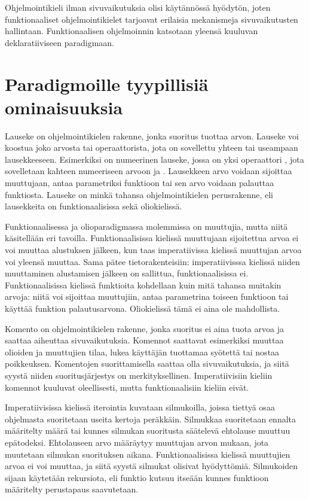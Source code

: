 Ohjelmointikieli ilman sivuvaikutuksia olisi käytännössä hyödytön, joten funktionaaliset ohjelmointikielet tarjoavat erilaisia mekanismeja sivuvaikutusten hallintaan.  Funktionaalisen ohjelmoinnin katsotaan yleensä kuuluvan deklaratiiviseen paradigmaan. \cite[Luku 11]{principlesAndParadigms}


\section{Paradigmoille tyypillisiä ominaisuuksia}
Lauseke on ohjelmointikielen rakenne, jonka suoritus tuottaa arvon. Lauseke voi koostua joko arvosta tai operaattorista, jota on sovellettu yhteen tai useampaan lausekkeeseen. Esimerkiksi  on numeerinen lauseke, jossa on yksi operaattori \code{+}, jota sovelletaan kahteen numeeriseen arvoon  ja . Lausekkeen arvo voidaan sijoittaa muuttujaan, antaa parametriksi funktioon tai sen arvo voidaan palauttaa funktiosta. Lauseke on minkä tahansa ohjelmointikielen perusrakenne, eli lausekkeita on funktionaalisissa sekä oliokielissä.
\cite[Luku 6]{principlesAndParadigms}

Funktionaalisessa ja olioparadigmassa molemmissa on muuttujia, mutta niitä käsitellään eri tavoilla. Funktionaalisissa kielissä muuttujaan sijoitettua arvoa ei voi muuttaa alustuksen jälkeen, kun taas imperatiivissa kielissä muuttujan arvoa voi yleensä muuttaa. Sama pätee tietorakenteisiin: imperatiivisssa kielissä niiden muuttaminen alustamisen jälkeen on sallittua, funktionaalisissa ei. \cite[Luku 3]{functionalProgrammingInScala} Funktionaalisissa kielissä funktioita kohdellaan kuin mitä tahansa muitakin arvoja: niitä voi sijoittaa muuttujiin, antaa parametrina toiseen funktioon tai käyttää funktion palautusarvona. Oliokielissä tämä ei aina ole mahdollista.
\cite[Luku 6]{principlesAndParadigms}

Komento on ohjelmointikielen rakenne, jonka suoritus ei aina tuota arvoa ja saattaa aiheuttaa sivuvaikutuksia. Komennot saattavat esimerkiksi muuttaa olioiden ja muuttujien tilaa, lukea käyttäjän tuottamaa syötettä tai nostaa poikkeuksen. Komentojen suorittamisella saattaa olla sivuvaikutuksia, ja siitä syystä niiden suoritusjärjestys on merkityksellinen. Imperatiivisiin kieliin komennot kuuluvat oleellisesti, mutta funktionaalisiin kieliin eivät.

Imperatiivisissa kielissä iterointia kuvataan silmukoilla, joissa tiettyä osaa ohjelmasta suoritetaan useita kertoja peräkkäin. Silmukkaa suoritetaan ennalta määritelty määrä tai kunnes silmukan suoritusta säätelevä ehtolause muuttuu epätodeksi. Ehtolauseen arvo määräytyy muuttujan arvon mukaan, jota muutetaan silmukan suorituksen aikana. Funktionaalisissa kielissä muuttujien arvoa ei voi muuttaa, ja siitä syystä silmukat olisivat hyödyttömiä. Silmukoiden sijaan käytetään rekursiota, eli funktio kutsuu itseään kunnes funktioon määritelty perustapaus saavutetaan.
\cite[Luku 6 ja 11]{principlesAndParadigms}

